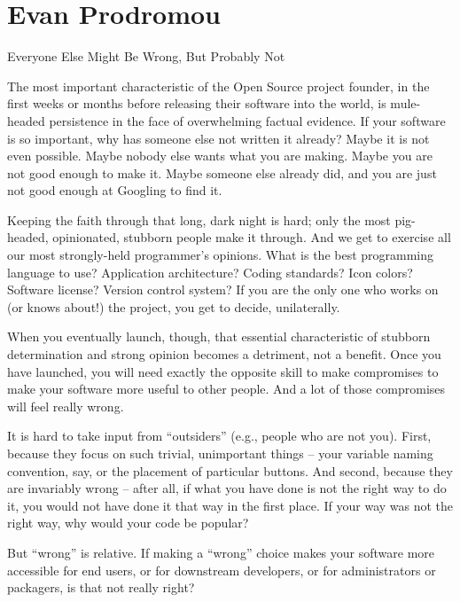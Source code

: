 
\chapter{Evan Prodromou}{Everyone Else Might Be Wrong, But Probably Not}

The most important characteristic of the Open Source project founder, in the
first weeks or months before releasing their software into the world, is
mule-headed persistence in the face of overwhelming factual evidence. If your
software is so important, why has someone else not written it already? Maybe it is not even possible. Maybe nobody else wants what you are making. Maybe you are not good enough to make it. Maybe someone else already did, and you are just not good enough at Googling to find it.

Keeping the faith through that long, dark night is hard; only the most
pig-headed, opinionated, stubborn people make it through. And we get to exercise
all our most strongly-held programmer's opinions. What is the best programming
language to use? Application architecture? Coding standards? Icon colors?
Software license? Version control system? If you are the only one who works on
(or knows about!) the project, you get to decide, unilaterally.

When you eventually launch, though, that essential characteristic of stubborn
determination and strong opinion becomes a detriment, not a benefit. Once you have launched, you will need exactly the opposite skill to make compromises to make your software more useful to other people. And a lot of those compromises will feel really wrong.

It is hard to take input from ``outsiders'' (e.g., people who are not you). First, because they focus on such trivial, unimportant things -- your variable naming convention, say, or the placement of particular buttons. And second, because they are invariably wrong -- after all, if what you have done is not the right way to do it, you would not have done it that way in the first place. If your way was not the right way, why would your code be popular?

But ``wrong'' is relative. If making a ``wrong'' choice makes your software more
accessible for end users, or for downstream developers, or for administrators or
packagers, is that not really right?

